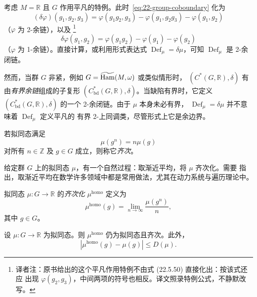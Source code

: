 考虑 $M=\mathbb R$ 且 $G$ 作用平凡的特例。此时~\eqref{eq:22-group-coboundary} 化为
\[
 (\delta\varphi)(g_1,g_2,g_3)
 =\varphi(g_1g_2,g_3)-\varphi(g_1,g_2g_3)-\varphi(g_1,g_2)
\]
（$\varphi$ 为 2-余链），以及
\footnote{译者注：原书给出的这个平凡作用特例不由式 (22.5.50) 直接化出：按该式还应
出现 $\varphi(g_2,g_3)$，中间两项的符号也相反。译文照录特例公式，不静默改写。}
\[
 \delta\varphi(g_1,g_2)=\varphi(g_1g_2)-\varphi(g_1)-\varphi(g_2)
\]
（$\varphi$ 为 1-余链）。直接计算，或利用形式表达式
$\operatorname{Def}_\mu=\delta\mu$，可知 $\operatorname{Def}_\mu$ 是 2-余闭链。

然而，当群 $G$ 非紧，例如 $G=\widetilde{\operatorname{Ham}}(M,\omega)$ 或类似情形时，
$(C^*(G,\mathbb R),\delta)$ 有由\emph{有界余链}组成的子复形
$(C_{\mathrm{bd}}^*(G,\mathbb R),\delta)$。当缺陷有界时，它定义
$(C_{\mathrm{bd}}^*(G,\mathbb R),\delta)$ 的一个 2-余闭链。由于 $\mu$ 本身未必有界，
$\operatorname{Def}_\mu=\delta\mu$ 并不意味着 $\operatorname{Def}_\mu$ 定义平凡的
有界 2-上同调类，尽管形式上它是余边界。

\begin{definition}
\label{def:22-homogeneous-quasimorphism}
若拟同态满足
\begin{equation}
 \mu(g^n)=n\mu(g)
 \label{eq:22-homogeneous-quasimorphism}
\end{equation}
对所有 $n\in\mathbb Z$ 及 $g\in G$ 成立，则称它\emph{齐次}。
\end{definition}

给定群 $G$ 上的拟同态 $\mu$，有一个自然过程：取渐近平均，将 $\mu$ 齐次化。需要
指出，取渐近平均在数学许多领域中都是常用做法，尤其在动力系统与遍历理论中。

\begin{definition}[齐次化]
\label{def:22-homogenization}
拟同态 $\mu:G\to\mathbb R$ 的\emph{齐次化} $\mu^{\mathrm{homo}}$ 定义为
\begin{equation}
 \mu^{\mathrm{homo}}(g)=\lim_{n\to\infty}\frac{\mu(g^n)}n,
 \label{eq:22-homogenization}
\end{equation}
其中 $g\in G$。
\end{definition}

\begin{proposition}
\label{prop:22-homogenization}
设 $\mu:G\to\mathbb R$ 为拟同态。则 $\mu^{\mathrm{homo}}$ 仍为拟同态且齐次。此外，
\begin{equation}
 |\mu^{\mathrm{homo}}(g)-\mu(g)|\leq D(\mu).
 \label{eq:22-homogenization-bound}
\end{equation}
\end{proposition}

